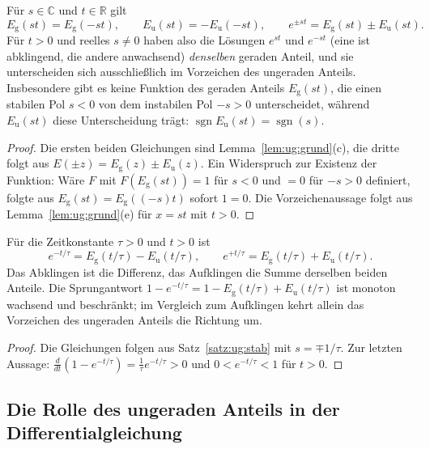\begin{satz}\label{satz:ug:stab}
Für $s\in\mathbb{C}$ und $t\in\mathbb{R}$ gilt
\[
E_{\mathrm g}(st)=E_{\mathrm g}(-st),\qquad E_{\mathrm u}(st)=-E_{\mathrm u}(-st),\qquad e^{\pm st}=E_{\mathrm g}(st)\pm E_{\mathrm u}(st).
\]
Für $t>0$ und reelles $s\neq0$ haben also die Lösungen $e^{st}$ und $e^{-st}$ (eine ist abklingend, die andere anwachsend) \emph{denselben} geraden Anteil, und sie unterscheiden sich ausschließlich im Vorzeichen des ungeraden Anteils. Insbesondere gibt es keine Funktion des geraden Anteils $E_{\mathrm g}(st)$, die einen stabilen Pol $s<0$ von dem instabilen Pol $-s>0$ unterscheidet, während $E_{\mathrm u}(st)$ diese Unterscheidung trägt: $\operatorname{sgn}E_{\mathrm u}(st)=\operatorname{sgn}(s)$.
\end{satz}

\begin{proof}
Die ersten beiden Gleichungen sind Lemma~\ref{lem:ug:grund}(c), die dritte folgt aus $E(\pm z)=E_{\mathrm g}(z)\pm E_{\mathrm u}(z)$. Ein Widerspruch zur Existenz der Funktion: Wäre $F$ mit $F(E_{\mathrm g}(st))=1$ für $s<0$ und $=0$ für $-s>0$ definiert, folgte aus $E_{\mathrm g}(st)=E_{\mathrm g}((-s)t)$ sofort $1=0$. Die Vorzeichenaussage folgt aus Lemma~\ref{lem:ug:grund}(e) für $x=st$ mit $t>0$.
\end{proof}

\begin{korollar}\label{kor:ug:rc}
Für die Zeitkonstante $\tau>0$ und $t>0$ ist
\[
e^{-t/\tau}=E_{\mathrm g}(t/\tau)-E_{\mathrm u}(t/\tau),\qquad e^{+t/\tau}=E_{\mathrm g}(t/\tau)+E_{\mathrm u}(t/\tau).
\]
Das Abklingen ist die Differenz, das Aufklingen die Summe derselben beiden Anteile. Die Sprungantwort $1-e^{-t/\tau}=1-E_{\mathrm g}(t/\tau)+E_{\mathrm u}(t/\tau)$ ist monoton wachsend und beschränkt; im Vergleich zum Aufklingen kehrt allein das Vorzeichen des ungeraden Anteils die Richtung um.
\end{korollar}

\begin{proof}
Die Gleichungen folgen aus Satz~\ref{satz:ug:stab} mit $s=\mp1/\tau$. Zur letzten Aussage: $\frac{d}{dt}(1-e^{-t/\tau})=\frac1\tau e^{-t/\tau}>0$ und $0<e^{-t/\tau}<1$ für $t>0$.
\end{proof}

\subsection{Die Rolle des ungeraden Anteils in der Differentialgleichung}
\label{sec:ug:dgl}


